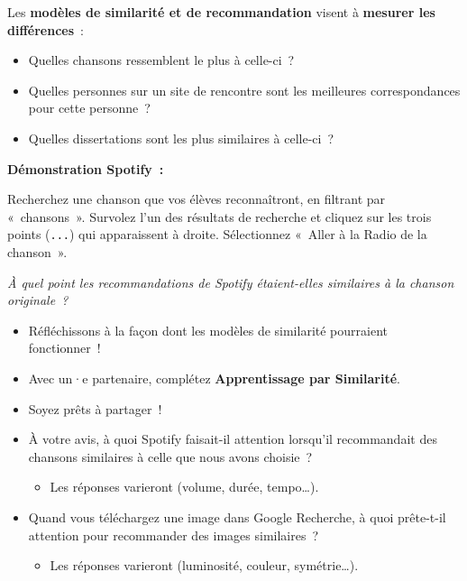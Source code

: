 \documentclass[12pt,a4paper]{article}
\begin{document}
Les \textbf{modèles de similarité et de recommandation} visent à \textbf{mesurer les différences}~:

\begin{itemize}
  \item Quelles chansons ressemblent le plus à celle-ci~?
  \item Quelles personnes sur un site de rencontre sont les meilleures correspondances pour cette personne~?
  \item Quelles dissertations sont les plus similaires à celle-ci~?
\end{itemize}

\begin{activitybox}
  \textbf{Démonstration Spotify~:}

  Recherchez une chanson que vos élèves reconnaîtront, en filtrant par «~chansons~». Survolez l'un des résultats de recherche et cliquez sur les trois points (\texttt{...}) qui apparaissent à droite. Sélectionnez «~Aller à la Radio de la chanson~».

  \begin{center}
    \textit{À quel point les recommandations de Spotify étaient-elles similaires à la chanson originale~?}
  \end{center}
\end{activitybox}

\begin{thinkbox}
  \begin{itemize}
    \item Réfléchissons à la façon dont les modèles de similarité pourraient fonctionner~!
    \item Avec un·e partenaire, complétez \textbf{Apprentissage par Similarité}.
    \item Soyez prêts à partager~!
  \end{itemize}
\end{thinkbox}

\begin{itemize}
  \item À votre avis, à quoi Spotify faisait-il attention lorsqu'il recommandait des chansons similaires à celle que nous avons choisie~?
  \begin{itemize}
    \item Les réponses varieront (volume, durée, tempo\ldots).
  \end{itemize}
  \item Quand vous téléchargez une image dans Google Recherche, à quoi prête-t-il attention pour recommander des images similaires~?
  \begin{itemize}
    \item Les réponses varieront (luminosité, couleur, symétrie\ldots).
  \end{itemize}
\end{itemize}
\end{document}
